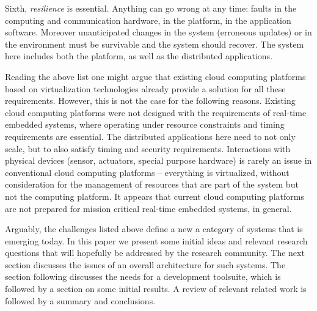 Sixth, \textit{resilience} is essential. Anything can go wrong at any
time: faults in the computing and communication hardware, in the
platform, in the application software. Moreover unanticipated changes
in the system (erroneous updates) or in the environment must be
survivable and the system should recover. The system here includes
both the platform, as well as the distributed applications.

Reading the above list one might argue that existing cloud computing
platforms based on virtualization technologies already provide a
solution for all these requirements. However, this is not the case for
the following reasons. Existing cloud computing platforms were not
designed with the requirements of real-time embedded systems, where
operating under resource constraints and timing requirements are
essential. The distributed applications here need to not only scale,
but to also  satisfy timing and security requirements. Interactions
with physical devices (sensor, actuators, special purpose hardware) is
rarely an issue in conventional cloud computing platforms --
everything is virtualized, without consideration for the management of
resources that are part of the system but not the computing
platform. It appears that current cloud computing platforms are not
prepared for mission critical real-time embedded systems, in general.

Arguably, the challenges listed above define a new a category of
systems that is emerging today. In this paper we present some initial
ideas and relevant research questions that will hopefully be addressed
by the research community. The next section discusses the issues of an
overall architecture for such systems. The section following discusses
the needs for a development toolsuite, which is followed by a section
on some initial results. A review of relevant related work is followed
by a summary and conclusions.



